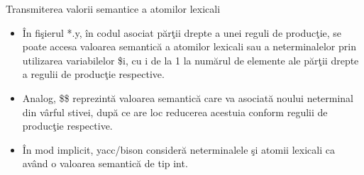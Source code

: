 \documentclass[pdf]{beamer}
\begin{document}
\begin{frame}{Transmiterea valorii semantice a atomilor lexicali}
\begin{itemize}
	\item
	În fişierul *.y, în codul asociat părţii drepte a unei reguli de producţie, se poate accesa valoarea semantică a atomilor lexicali sau a neterminalelor prin utilizarea variabilelor {\color{red}\$i}, cu i de la 1 la numărul de elemente ale părţii drepte a regulii de producţie respective.

	\item
	Analog, {\color{red}\$\$} reprezintă valoarea semantică care va asociată noului neterminal din vârful stivei, după ce are loc reducerea acestuia conform regulii de producţie respective.

	\item
	În mod implicit, yacc/bison consideră neterminalele şi atomii lexicali ca având o valoarea semantică de tip {\color{red}int}.

\end{itemize}
\end{frame}
\end{document}
